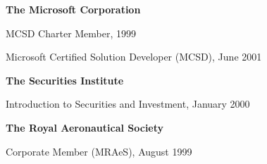 \documentclass[10pt]{article}
\renewcommand{\section}[2]%
        {\pagebreak[2]\vspace{1.3\baselineskip}%
         \phantomsection\addcontentsline{toc}{section}{#1}%
         \hspace{0in}%
         \marginpar{
         \raggedright \scshape #1}#2}
\newenvironment{innerlist}[1][\enskip\textbullet]%
        {\begin{compactitem}[#1]}{\end{compactitem}}
\newcommand{\blankline}{\quad\pagebreak[2]}
\begin{document}
\blankline

\textbf{The Microsoft Corporation}
\begin{innerlist}
\item MCSD Charter Member, 1999
\item Microsoft Certified Solution Developer (MCSD), June 2001
%
\end{innerlist}

\blankline

\textbf{The Securities Institute}
\begin{innerlist}
\item Introduction to Securities and Investment, January 2000
%
\end{innerlist}

\blankline

\textbf{The Royal Aeronautical Society}
\begin{innerlist}
\item Corporate Member (MRAeS), August 1999
\end{innerlist}
%
%
%
\end{document}
